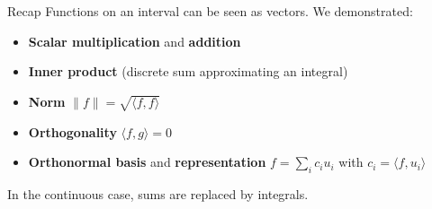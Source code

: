 \documentclass[aspectratio=169]{beamer}
\begin{document}
\begin{frame}{Recap}
  \small
  Functions on an interval can be seen as vectors. We demonstrated:
  \begin{itemize}
    \item \textbf{Scalar multiplication} and \textbf{addition}
    \item \textbf{Inner product} (discrete sum approximating an integral)
    \item \textbf{Norm} $\|f\| = \sqrt{\langle f,f \rangle}$
    \item \textbf{Orthogonality} $\langle f,g \rangle = 0$
    \item \textbf{Orthonormal basis} and \textbf{representation} $f = \sum_i c_i u_i$ with $c_i = \langle f, u_i \rangle$
  \end{itemize}
  \vspace{0.2cm}
  In the continuous case, sums are replaced by integrals.
\end{frame}
\end{document}
